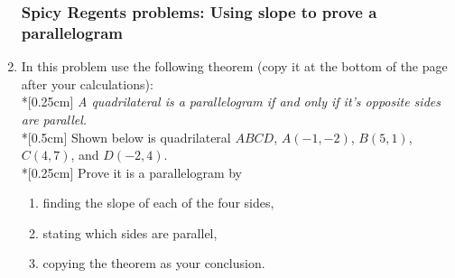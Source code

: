\documentclass[12pt, twoside]{article}
\begin{document}
\begin{enumerate}
\subsubsection*{Spicy Regents problems: Using slope to prove a parallelogram}
  \item In this problem use the following theorem (copy it at the bottom of the page after your calculations): \\*[0.25cm]
  \emph{A quadrilateral is a parallelogram if and only if it's opposite sides are parallel.}\\*[0.5cm]
  Shown below is quadrilateral $ABCD$, $A(-1,-2)$, $B(5,1)$, $C(4,7)$, and $D(-2,4)$. \\*[0.25cm]
  Prove it is a parallelogram by
  \begin{enumerate}
    \item finding the slope of each of the four sides,
    \item stating which sides are parallel,
    \item copying the theorem as your conclusion.
  \end{enumerate}
  \begin{flushright} %
  \end{flushright}

\newpage

\end{enumerate}
\end{document}
